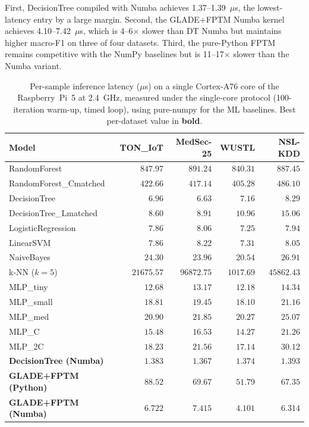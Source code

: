 \documentclass[journal,10pt]{IEEEtran}
\begin{document}
First, DecisionTree compiled with Numba achieves 1.37--1.39~$\mu$s,
the lowest-latency entry by a large margin. Second, the GLADE+FPTM
Numba kernel achieves 4.10--7.42~$\mu$s, which is 4--6$\times$ slower
than DT Numba but maintains higher macro-F1 on three of four datasets.
Third, the pure-Python FPTM remains competitive with the NumPy baselines
but is 11--17$\times$ slower than the Numba variant.

\begin{table}[t]
\centering\small
\caption{Per-sample inference latency ($\mu$s) on a single Cortex-A76 core of
         the Raspberry~Pi~5 at 2.4~GHz, measured under the single-core
         protocol (100-iteration warm-up, timed loop), using pure-numpy
         for the ML baselines. Best per-dataset value in \textbf{bold}.}
\label{tab:full_latency}
\begin{tabular}{lrrrr}
\toprule
\textbf{Model} & \textbf{TON\_IoT} & \textbf{MedSec-25} & \textbf{WUSTL} & \textbf{NSL-KDD} \\
\midrule
RandomForest                 & $847.97$    & $891.24$    & $840.31$   & $887.45$   \\
RandomForest\_Cmatched       & $422.66$    & $417.14$    & $405.28$   & $486.10$   \\
DecisionTree                 & $6.96$      & $6.63$      & $7.16$     & $8.29$     \\
DecisionTree\_Lmatched       & $8.60$      & $8.91$      & $10.96$    & $15.06$    \\
LogisticRegression           & $7.86$      & $8.06$      & $7.25$     & $7.94$     \\
LinearSVM                    & $7.86$      & $8.22$      & $7.31$     & $8.05$     \\
NaiveBayes                   & $24.30$     & $23.96$     & $20.54$    & $26.91$    \\
k-NN ($k{=}5$)               & $21675.57$  & $96872.75$  & $1017.69$  & $45862.43$ \\
MLP\_tiny                    & $12.68$     & $13.17$     & $12.18$    & $14.34$    \\
MLP\_small                   & $18.81$     & $19.45$     & $18.10$    & $21.16$    \\
MLP\_med                     & $20.90$     & $21.85$     & $20.27$    & $25.07$    \\
MLP\_C                       & $15.48$     & $16.53$     & $14.27$    & $21.26$    \\
MLP\_2C                      & $18.23$     & $21.56$     & $17.14$    & $30.12$    \\
\midrule
\textbf{DecisionTree (Numba)}        & $\mathbf{1.383}$ & $\mathbf{1.367}$ & $\mathbf{1.374}$ & $\mathbf{1.393}$ \\
\midrule
\textbf{GLADE+FPTM (Python)} & $88.52$     & $69.67$     & $51.79$    & $67.35$    \\
\textbf{GLADE+FPTM (Numba)}  & $6.722$     & $7.415$     & $4.101$    & $6.314$    \\
\bottomrule
\end{tabular}
\end{table}
\end{document}
